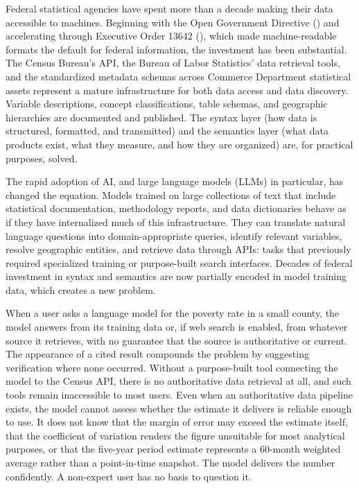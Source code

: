 \documentclass[
  11pt,
  letterpaper,
]{article}
\begin{document}
Federal statistical agencies have spent more than a decade making their
data accessible to machines. Beginning with the Open Government
Directive () and accelerating through Executive Order 13642
(), which
made machine-readable formats the default for federal information, the
investment has been substantial. The Census Bureau's API, the Bureau of
Labor Statistics' data retrieval tools, and the standardized metadata
schemas across Commerce Department statistical assets represent a mature
infrastructure for both data access and data discovery. Variable
descriptions, concept classifications, table schemas, and geographic
hierarchies are documented and published. The syntax layer (how data is
structured, formatted, and transmitted) and the semantics layer (what
data products exist, what they measure, and how they are organized) are,
for practical purposes, solved.

The rapid adoption of AI, and large language models (LLMs) in
particular, has changed the equation. Models trained on large
collections of text that include statistical documentation, methodology
reports, and data dictionaries behave as if they have internalized much
of this infrastructure. They can translate natural language questions
into domain-appropriate queries, identify relevant variables, resolve
geographic entities, and retrieve data through APIs: tasks that
previously required specialized training or purpose-built search
interfaces. Decades of federal investment in syntax and semantics are
now partially encoded in model training data, which creates a new
problem.

When a user asks a language model for the poverty rate in a small
county, the model answers from its training data or, if web search is
enabled, from whatever source it retrieves, with no guarantee that the
source is authoritative or current. The appearance of a cited result
compounds the problem by suggesting verification where none occurred.
Without a purpose-built tool connecting the model to the Census API,
there is no authoritative data retrieval at all, and such tools remain
inaccessible to most users. Even when an authoritative data pipeline
exists, the model cannot assess whether the estimate it delivers is
reliable enough to use. It does not know that the margin of error may
exceed the estimate itself, that the coefficient of variation renders
the figure unsuitable for most analytical purposes, or that the
five-year period estimate represents a 60-month weighted average rather
than a point-in-time snapshot. The model delivers the number
confidently. A non-expert user has no basis to question it.
\end{document}
